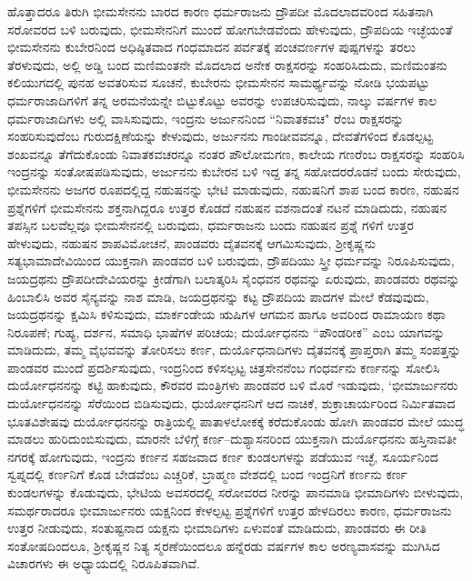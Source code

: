 ಹೊತ್ತಾದರೂ ತಿರುಗಿ ಭೀಮಸೇನನು ಬಾರದ ಕಾರಣ ಧರ್ಮರಾಜನು ದ್ರೌಪದೀ ಮೊದಲಾದವರಿಂದ ಸಹಿತನಾಗಿ ಸರೋವರದ ಬಳಿ ಬರುವುದು, ಭೀಮಸೇನನಿಗೆ ಮುಂದೆ ಹೋಗಬೇಡವೆಂದು ಹೇಳುವುದು, ದ್ರೌಪದಿಯ ಇಚ್ಛೆಯಂತೆ ಭೀಮಸೇನನು ಕುಬೇರನಿಂದ ಅಧಿಷ್ಠಿತವಾದ ಗಂಧಮಾದನ ಪರ್ವತಕ್ಕೆ ಪಂಚವರ್ಣಗಳ ಪುಷ್ಪಗಳನ್ನು ತರಲು ತೆರಳುವುದು, ಅಲ್ಲಿ ಅಡ್ಡಿ ಬಂದ ಮಣಿಮಂತನೇ ಮೊದಲಾದ ಅನೇಕ ರಾಕ್ಷಸರನ್ನು ಸಂಹರಿಸಿದುದು, ಮಣಿಮಂತನು ಕಲಿಯುಗದಲ್ಲಿ ಪುನಹ ಅವತರಿಸುವ ಸೂಚನೆ, ಕುಬೇರನು ಭೀಮಸೇನನ ಸಾಮರ್ಥ್ಯವನ್ನು ನೋಡಿ ಭಯಪಟ್ಟು ಧರ್ಮರಾಜಾದಿಗಳಿಗೆ ತನ್ನ ಅರಮನೆಯನ್ನೇ ಬಿಟ್ಟುಕೊಟ್ಟು ಅವರನ್ನು ಉಪಚರಿಸುವುದು, ನಾಲ್ಕು ವರ್ಷಗಳ ಕಾಲ ಧರ್ಮರಾಜಾದಿಗಳು ಅಲ್ಲಿ ವಾಸಿಸುವುದು, ಇಂದ್ರನು ಅರ್ಜುನನಿಂದ “ನಿವಾತಕವಚ" ರೆಂಬ ರಾಕ್ಷಸರನ್ನು ಸಂಹರಿಸುವುದೆಂಬ ಗುರುದಕ್ಷಿಣೆಯನ್ನು ಕೇಳುವುದು, ಅರ್ಜುನನು ಗಾಂಡೀವವನ್ನೂ, ದೇವತೆಗಳಿಂದ ಕೊಡಲ್ಪಟ್ಟ ಶಂಖವನ್ನೂ ತೆಗೆದುಕೊಂಡು ನಿವಾತಕವಚರನ್ನೂ ನಂತರ ಪೌಲೋಮಗಣ, ಕಾಲೇಯ ಗಣರೆಂಬ ರಾಕ್ಷಸರನ್ನು ಸಂಹರಿಸಿ ಇಂದ್ರನನ್ನು ಸಂತೋಷಪಡಿಸುವುದು, ಅರ್ಜುನನು ಕುಬೇರನ ಬಳಿ ಇದ್ದ ತನ್ನ ಸಹೋದರರೊಡನೆ ಬಂದು ಸೇರುವುದು, ಭೀಮಸೇನನು ಅಜಗರ ರೂಪದಲ್ಲಿದ್ದ ನಹುಷನನ್ನು ಭೇಟಿ ಮಾಡುವುದು, ನಹುಷನಿಗೆ ಶಾಪ ಬಂದ ಕಾರಣ, ನಹುಷನ ಪ್ರಶ್ನೆಗಳಿಗೆ ಭೀಮಸೇನನು ಶಕ್ತನಾಗಿದ್ದರೂ ಉತ್ತರ ಕೊಡದೆ ನಹುಷನ ವಶನಾದಂತೆ ನಟನೆ ಮಾಡಿದುದು, ನಹುಷನ ತಪಸ್ಸಿನ ಬಲವೆಲ್ಲವೂ ಭೀಮಸೇನನಲ್ಲಿ ಬರುವುದು, ಧರ್ಮರಾಜನು ಬಂದು ನಹುಷನ ಪ್ರಶ್ನೆ ಗಳಿಗೆ ಉತ್ತರ ಹೇಳುವುದು, ನಹುಷನ ಶಾಪವಿಮೋಚನೆ, ಪಾಂಡವರು ದೈತವನಕ್ಕೆ ಆಗಮಿಸುವುದು, ಶ‍್ರೀಕೃಷ್ಣನು ಸತ್ಯಭಾಮಾದೇವಿಯಿಂದ ಯುಕ್ತನಾಗಿ ಪಾಂಡವರ ಬಳಿ ಬರುವುದು, ದ್ರೌಪದಿಯು ಸ್ತ್ರೀ ಧರ್ಮವನ್ನು ನಿರೂಪಿಸುವುದು, ಜಯದ್ರಥನು ದ್ರೌಪದೀದೇವಿಯರನ್ನು ಕ್ರೀಡೆಗಾಗಿ ಬಲಾತ್ಕರಿಸಿ ಸೈಂಧವನ ರಥವನ್ನು ಏರುವುದು, ಪಾಂಡವರು ರಥವನ್ನು ಹಿಂಬಾಲಿಸಿ ಅವರ ಸೈನ್ಯವನ್ನು ನಾಶ ಮಾಡಿ, ಜಯದ್ರಥನನ್ನು ಕಟ್ಟ ದ್ರೌಪದಿಯ ಪಾದಗಳ ಮೇಲೆ ಕೆಡವುವುದು, ಜಯದ್ರಥನನ್ನು ಕ್ಷಮಿಸಿ ಕಳಿಸುವುದು, ಮಾರ್ಕಂಡೇಯ ಋಷಿಗಳ ಆಗಮನ ಹಾಗೂ ಅವರಿಂದ ರಾಮಾಯಣ ಕಥಾ ನಿರೂಪಣೆ; ಗುಹ್ಯ, ದರ್ಶನ, ಸಮಾಧಿ ಭಾಷೆಗಳ ಪರಿಚಯ; ದುರ್ಯೋಧನನು “ಪೌಂಡರೀಕ” ಎಂಬ ಯಾಗವನ್ನು ಮಾಡಿದುದು, ತಮ್ಮ ವೈಭವವನ್ನು ತೋರಿಸಲು ಕರ್ಣ, ದುರ್ಯೊಧನಾದಿಗಳು ದೈತವನಕ್ಕೆ ಪ್ರಾಪ್ತರಾಗಿ ತಮ್ಮ ಸಂಪತ್ತನ್ನು ಪಾಂಡವರ ಮುಂದೆ ಪ್ರದರ್ಶಿಸುವುದು, ಇಂದ್ರನಿಂದ ಕಳಿಸಲ್ಪಟ್ಟ ಚಿತ್ರಸೇನನೆಂಬ ಗಂಧರ್ವನು ಕರ್ಣನನ್ನು ಸೋಲಿಸಿ ದುರ್ಯೋಧನನನ್ನು ಕಟ್ಟಿ ಹಾಕುವುದು, ಕೌರವರ ಮಂತ್ರಿಗಳು ಪಾಂಡವರ ಬಳಿ ಮೊರೆ ಇಡುವುದು, `ಭೀಮಾರ್ಜುನರು ದುರ್ಯೋಧನನನ್ನು ಸೆರೆಯಿಂದ ಬಿಡಿಸುವುದು, ಧುರ್ಯೋಧನನಿಗೆ ಆದ ನಾಚಿಕೆ, ಶುಕ್ರಾಚಾರ್ಯರಿಂದ ನಿರ್ಮಿತವಾದ ಭೂತವಿಶೇಷವು ದುರ್ಯೋಧನನನ್ನು ರಾತ್ರಿಯಲ್ಲಿ ಪಾತಾಳಲೋಕಕ್ಕೆ ಕರೆದುಕೊಂಡು ಹೋಗಿ ಪಾಂಡವರ ಮೇಲೆ ಯುದ್ಧ ಮಾಡಲು ಹುರಿದುಂಬಿಸುವುದು, ಮಾರನೇ ಬೆಳಿಗ್ಗೆ ಕರ್ಣ–ದುಶ್ಯಾಸನರಿಂದ ಯುಕ್ತನಾಗಿ ದುರ್ಯೊಧನನು ಹಸ್ತಿನಾವತೀ ನಗರಕ್ಕೆ ಹೋಗುವುದು, ಇಂದ್ರನು ಕರ್ಣನ ಸಹಜವಾದ ಕರ್ಣ ಕುಂಡಲಗಳನ್ನು ಪಡೆಯುವ ಇಚ್ಛೆ, ಸೂರ್ಯನಿಂದ ಸ್ವಪ್ನದಲ್ಲಿ ಕರ್ಣನಿಗೆ ಕೊಡ ಬೇಡವೆಂಬ ಎಚ್ಚರಿಕೆ, ಬ್ರಾಹ್ಮಣ ವೇಶದಲ್ಲಿ ಬಂದ ಇಂದ್ರನಿಗೆ ಕರ್ಣನು ಕರ್ಣ ಕುಂಡಲಗಳನ್ನು ಕೊಡುವುದು, ಭೇಟಿಯ ಅವಸರದಲ್ಲಿ ಸರೋವರದ ನೀರನ್ನು ಪಾನಮಾಡಿ ಭೀಮಾದಿಗಳು ಬೀಳುವುದು, ಸಮರ್ಥರಾದರೂ ಭೀಮಾರ್ಜುನರು ಯಕ್ಷನಿಂದ ಕೇಳಲ್ಪಟ್ಟ ಪ್ರಶ್ನೆಗಳಿಗೆ ಉತ್ತರ ಹೇಳದಿರಲು ಕಾರಣ, ಧರ್ಮರಾಜನು ಉತ್ತರ ನೀಡುವುದು, ಸಂತುಷ್ಟನಾದ ಯಕ್ಷನು ಭೀಮಾದಿಗಳು ಏಳುವಂತೆ ಮಾಡಿದುದು, ಪಾಂಡವರು ಈ ರೀತಿ ಸಂತೋಷದಿಂದಲೂ, ಶ‍್ರೀಕೃಷ್ಣನ ನಿತ್ಯ ಸ್ಮರಣೆಯಿಂದಲೂ ಹನ್ನೆರಡು ವರ್ಷಗಳ ಕಾಲ ಅರಣ್ಯವಾಸವನ್ನು ಮುಗಿಸಿದ ವಿಚಾರಗಳು ಈ ಅಧ್ಯಾಯದಲ್ಲಿ ನಿರೂಪಿತವಾಗಿವೆ.


